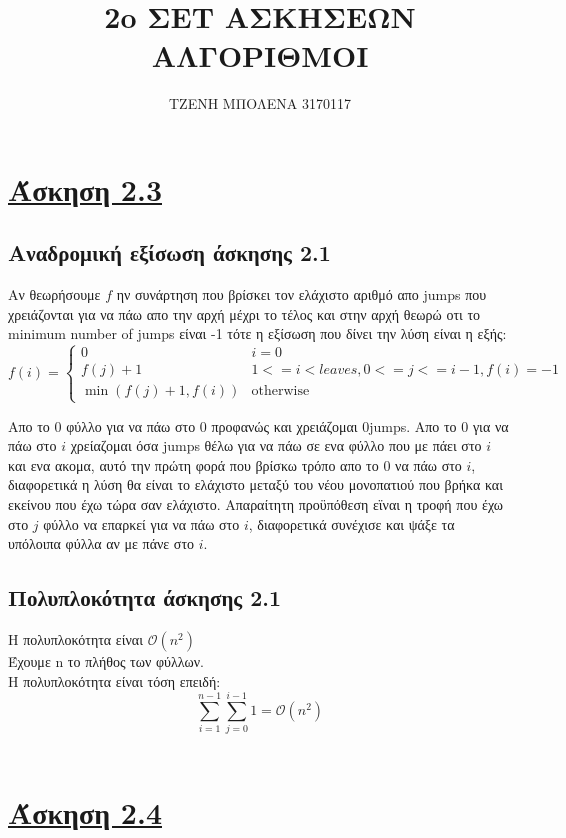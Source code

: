 \documentclass[12pt]{article}
\title{2o ΣΕΤ ΑΣΚΗΣΕΩΝ \\ ΑΛΓΟΡΙΘΜΟΙ}
\author{ΤΖΕΝΗ ΜΠΟΛΕΝΑ 3170117}
\date{}
\begin{document}
\maketitle

\section{\underline{Άσκηση 2.3}}
\subsection{Αναδρομική εξίσωση άσκησης 2.1}
Αν θεωρήσουμε $f$ ην συνάρτηση που βρίσκει τον ελάχιστο αριθμό απο jumps που χρειάζονται για να πάω απο την αρχή μέχρι το τέλος και στην αρχή θεωρώ οτι το minimum number of jumps είναι -1 τότε η εξίσωση που δίνει την λύση είναι η εξής:\\ 
\begin{equation*}
	f(i) = \begin{cases}
	0               & i = 0\\
	f(j) + 1        & 1<=i<leaves,  0<=j<=i-1, f(i) = -1\\
	\min{(f(j) + 1, f(i) )}& \text{otherwise}
	\end{cases}
\end{equation*}

Απο το $0$ φύλλο για να πάω στο $0$ προφανώς και χρειάζομαι $0$jumps. Απο το $0$ για να πάω στο $i$ χρείαζομαι όσα jumps θέλω για να πάω σε ενα φύλλο που με πάει στο $i$ και ενα ακομα, αυτό την πρώτη φορά που βρίσκω τρόπο απο το 0 να πάω στο $i$, διαφορετικά η λύση θα είναι το ελάχιστο μεταξύ του νέου μονοπατιού που βρήκα και εκείνου που έχω τώρα σαν ελάχιστο. Απαραίτητη προϋπόθεση εϊναι η τροφή που έχω στο $j$ φύλλο να επαρκεί για να πάω στο $i$, διαφορετικά συνέχισε και ψάξε τα υπόλοιπα φύλλα αν με πάνε στο $i$.\\

\subsection{Πολυπλοκότητα άσκησης 2.1}
Η πολυπλοκότητα είναι $\mathcal{O}(n^2)$\\
Έχουμε n το πλήθος των φύλλων.\\
Η πολυπλοκότητα είναι τόση επειδή:
$$\sum_{i=1}^{n-1}\sum_{j=0}^{i-1} 1 = \mathcal{O}(n^2)$$\\



\section{\underline{Άσκηση 2.4}}
\end{document}
